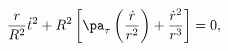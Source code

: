 \begin{equation}
\frac{r}{R^2}\dot{t}^2 + R^2\left[ \pa_{\tau}\left(\frac{\dot{r}}{r^2}
\right) + \frac{\dot{r}^2}{r^3} \right] = 0,
\label{req}\end{equation}

